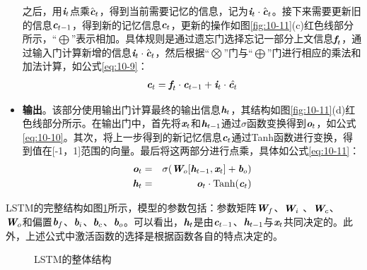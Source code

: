 \begin{itemize}
之后，用$\textbf{\em i}_t$点乘$\hat{\textbf{\em c}}_t$，得到当前需要记忆的信息，记为$\textbf{\em i}_t \cdot  \hat{\textbf{\em c}}_t$。接下来需要更新旧的信息$\textbf{\em c}_{t-1}$，得到新的记忆信息$\textbf{\em c}_t$，更新的操作如图\ref{fig:10-11}(c)红色线部分所示，“$\bigoplus$”表示相加。具体规则是通过遗忘门选择忘记一部分上文信息$\textbf{\em f}_t$，通过输入门计算新增的信息$\textbf{\em i}_t \cdot  \hat{\textbf{\em c}}_t$，然后根据“$\bigotimes$”门与“$\bigoplus$”门进行相应的乘法和加法计算，如公式\eqref{eq:10-9}：
\begin{eqnarray}
\textbf{\em c}_t = \textbf{\em f}_t \cdot \textbf{\em c}_{t-1} + \textbf{\em i}_t  \cdot \hat{\textbf{\em c}_t}
\label{eq:10-9}
\end{eqnarray}
\vspace{-1.0em}
\item {\small\sffamily\bfseries{输出}}。该部分使用输出门计算最终的输出信息$\textbf{\em h}_t$，其结构如图\ref{fig:10-11}(d)红色线部分所示。在输出门中，首先将$\textbf{\em x}_t$和$\textbf{\em h}_{t-1}$通过$\sigma$函数变换得到$\textbf{\em o}_t$，如公式\eqref{eq:10-10}。其次，将上一步得到的新记忆信息$\textbf{\em c}_t$通过Tanh函数进行变换，得到值在[-1，1]范围的向量。最后将这两部分进行点乘，具体如公式\eqref{eq:10-11}：
\begin{eqnarray}
\textbf{\em o}_t & = & \sigma (\textbf{\em W}_o [\textbf{\em h}_{t-1},\textbf{\em x}_{t}] + \textbf{\em b}_o ) \label{eq:10-10} \\
\textbf{\em h}_t & = & \textbf{\em o}_t \cdot \textrm{Tanh} (\textbf{\em c}_t) \label{eq:10-11}
\end{eqnarray}
\vspace{0.5em}
\end{itemize}

\vspace{-0.8em}
\parinterval LSTM的完整结构如图\ref{fig:10-12}所示，模型的参数包括：参数矩阵$\textbf{\em W}_f$、$\textbf{\em W}_i$ 、$\textbf{\em W}_c$、\\$\textbf{\em W}_o$和偏置$\textbf{\em b}_f$、$\textbf{\em b}_i$、$\textbf{\em b}_c$、$\textbf{\em b}_o$。可以看出，$\textbf{\em h}_t$是由$\textbf{\em c}_{t-1}$、$\textbf{\em h}_{t-1}$与$\textbf{\em x}_t$共同决定的。此外，上述公式中激活函数的选择是根据函数各自的特点决定的。

\begin{figure}[htp]
\centering

\caption{LSTM的整体结构}
\label{fig:10-12}
\end{figure}


